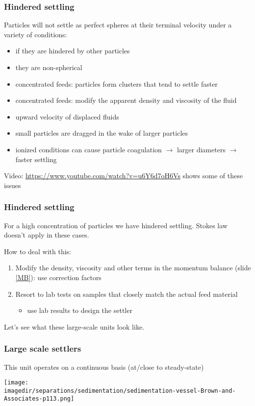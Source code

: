 \begin{frame}\frametitle{{\color{purple}Hindered settling}}
	Particles will not settle as perfect spheres at their terminal velocity under a variety of conditions:
	\begin{itemize}
		\item	if they are hindered by other particles
		\item	they are non-spherical
		\item	concentrated feeds: particles form clusters that tend to settle faster
		\item	concentrated feeds: modify the apparent density and viscosity of the fluid
		\item	upward velocity of displaced fluids
		\item	small particles are dragged in the wake of larger particles
		\item	ionized conditions can cause particle coagulation $\rightarrow$ larger diameters $\rightarrow$ faster settling
	\end{itemize}

	\vspace{12pt}
	Video: \href{https://www.youtube.com/watch?v=u6Y6d7oH6Vs}{https://www.youtube.com/watch?v=u6Y6d7oH6Vs} shows some of these issues

\end{frame}

\begin{frame}\frametitle{Hindered settling}
	For a high concentration of particles we have hindered settling. Stokes law doesn't apply in these cases.
	
	\vspace{12pt}
	How to deal with this:
	\begin{enumerate}
		\item	Modify the density, viscosity and other terms in the momentum balance (slide \ref{MB}): use correction factors
		\item	Resort to lab tests on samples that closely match the actual feed material
		\begin{itemize}
			\item	use lab results to design the settler
		\end{itemize}
	\end{enumerate}
	
	\vspace{12pt}
	Let's see what these large-scale units look like.
\end{frame}

\begin{frame}\frametitle{Large scale settlers}
	This unit operates on a continuous basis (at/close to {\color{myOrange}steady-state})
	\begin{center}
		\texttt{[image: \\imagedir/separations/sedimentation/sedimentation-vessel-Brown-and-Associates-p113.png]}
	\end{center}
\end{frame}

